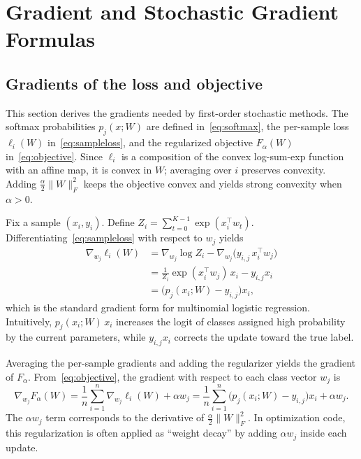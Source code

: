 \documentclass[11pt]{article}
\numberwithin{equation}{section}
\numberwithin{table}{section}
\numberwithin{figure}{section}
\numberwithin{algorithm}{section}
\begin{document}
\section{Gradient and Stochastic Gradient Formulas}
\subsection{Gradients of the loss and objective}
This section derives the gradients needed by first-order stochastic methods. The softmax probabilities \(p_j(x;W)\) are defined in~\eqref{eq:softmax}, the per-sample loss \(\ell_i(W)\) in~\eqref{eq:sampleloss}, and the regularized objective \(F_\alpha(W)\) in~\eqref{eq:objective}. Since \(\ell_i\) is a composition of the convex log-sum-exp function with an affine map, it is convex in \(W\); averaging over \(i\) preserves convexity. Adding \(\frac{\alpha}{2}\lVert W\rVert_F^2\) keeps the objective convex and yields strong convexity when \(\alpha>0\).

Fix a sample \((x_i,y_i)\). Define \(Z_i=\sum_{t=0}^{K-1}\exp(x_i^\top w_t)\). Differentiating~\eqref{eq:sampleloss} with respect to \(w_j\) yields
\begin{align}
\nabla_{w_j}\ell_i(W)
&=\nabla_{w_j}\log Z_i-\nabla_{w_j}\big(y_{i,j}\,x_i^\top w_j\big) \nonumber\\
&=\frac{1}{Z_i}\exp(x_i^\top w_j)\,x_i-y_{i,j}x_i \nonumber\\
&=\big(p_j(x_i;W)-y_{i,j}\big)x_i,
\label{eq:perclassgrad}
\end{align}
which is the standard gradient form for multinomial logistic regression. Intuitively, \(p_j(x_i;W)\,x_i\) increases the logit of classes assigned high probability by the current parameters, while \(y_{i,j}x_i\) corrects the update toward the true label.

Averaging the per-sample gradients and adding the regularizer yields the gradient of \(F_\alpha\). From~\eqref{eq:objective}, the gradient with respect to each class vector \(w_j\) is
\begin{equation}
\nabla_{w_j}F_\alpha(W)=\frac{1}{n}\sum_{i=1}^{n}\nabla_{w_j}\ell_i(W)+\alpha w_j
=\frac{1}{n}\sum_{i=1}^{n}\big(p_j(x_i;W)-y_{i,j}\big)x_i+\alpha w_j.
\label{eq:fullgrad}
\end{equation}
The \(\alpha w_j\) term corresponds to the derivative of \(\frac{\alpha}{2}\lVert W\rVert_F^2\). In optimization code, this regularization is often applied as ``weight decay'' by adding \(\alpha w_j\) inside each update.
\end{document}
